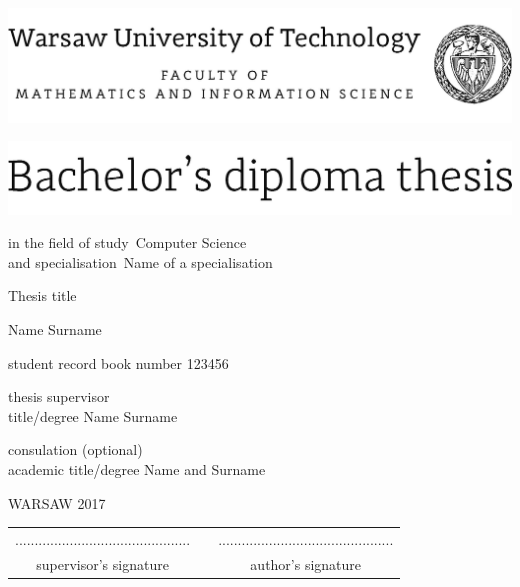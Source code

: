 \documentclass[12pt,twoside,a4paper]{article}
\newcommand{\discipline}{Computer Science}
\newcommand{\spec}{Name of a specialisation}
\renewcommand{\title}{Thesis title}
\renewcommand{\author}{Name Surname}
\newcommand{\supervisor}{title/degree Name Surname}
\newcommand{\album}{123456}
\renewcommand{\year}{2017}
\begin{document}
\pagestyle{empty}


\begin{center}
\includegraphics[scale=1.]{wut}
\vspace{70pt}


\includegraphics[scale=1.]{bachelor} %

{ \arial
in the field of study~\discipline \\
and specialisation~\spec

\vspace{30pt}
{\arial \large \title}

\vspace{50pt}

{\arial \huge \author}

\vspace{5pt}

student record book number \album

\vspace{40pt}

thesis supervisor \\
{\arial \supervisor}

\vspace{15pt}
 
consulation (optional)  \\
{\arial academic title/degree Name and Surname}

 \vfill
WARSAW \year \\
}
\end{center}


\newpage
\null

\vfill

\begin{center}
\begin{tabular}[t]{ccc}
............................................. & \hspace*{100pt} & .............................................\\
supervisor's signature & \hspace*{100pt} & author's signature
\end{tabular}
\end{center}
\end{document}
